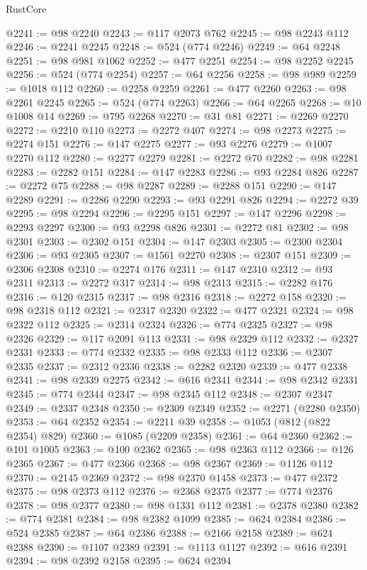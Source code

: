\begin{lexlean}{RustCore}
\begin{coremodule}
@2241 := @98 @2240
@2243 := @117 @2073 @762
@2245 := @98 @2243 @112
@2246 := @2241 @2245
@2248 := @524 (@774 @2246)
@2249 := @64 @2248
@2251 := @98 @981 @1062
@2252 := @477 @2251
@2254 := @98 @2252 @2245
@2256 := @524 (@774 @2254)
@2257 := @64 @2256
@2258 := @98 @989
@2259 := @1018 @112
@2260 := @2258 @2259
@2261 := @477 @2260
@2263 := @98 @2261 @2245
@2265 := @524 (@774 @2263)
@2266 := @64 @2265
@2268 := @10 @1008 @14
@2269 := @795 @2268
@2270 := @31 @81
@2271 := @2269 @2270
@2272 := @2210 @110
@2273 := @2272 @407
@2274 := @98 @2273
@2275 := @2274 @151
@2276 := @147 @2275
@2277 := @93 @2276
@2279 := @1007 @2270 @112
@2280 := @2277 @2279
@2281 := @2272 @70
@2282 := @98 @2281
@2283 := @2282 @151
@2284 := @147 @2283
@2286 := @93 @2284 @826
@2287 := @2272 @75
@2288 := @98 @2287
@2289 := @2288 @151
@2290 := @147 @2289
@2291 := @2286 @2290
@2293 := @93 @2291 @826
@2294 := @2272 @39
@2295 := @98 @2294
@2296 := @2295 @151
@2297 := @147 @2296
@2298 := @2293 @2297
@2300 := @93 @2298 @826
@2301 := @2272 @81
@2302 := @98 @2301
@2303 := @2302 @151
@2304 := @147 @2303
@2305 := @2300 @2304
@2306 := @93 @2305
@2307 := @1561 @2270
@2308 := @2307 @151
@2309 := @2306 @2308
@2310 := @2274 @176
@2311 := @147 @2310
@2312 := @93 @2311
@2313 := @2272 @317
@2314 := @98 @2313
@2315 := @2282 @176
@2316 := @120 @2315
@2317 := @98 @2316
@2318 := @2272 @158
@2320 := @98 @2318 @112
@2321 := @2317 @2320
@2322 := @477 @2321
@2324 := @98 @2322 @112
@2325 := @2314 @2324
@2326 := @774 @2325
@2327 := @98 @2326
@2329 := @117 @2091 @113
@2331 := @98 @2329 @112
@2332 := @2327 @2331
@2333 := @774 @2332
@2335 := @98 @2333 @112
@2336 := @2307 @2335
@2337 := @2312 @2336
@2338 := @2282 @2320
@2339 := @477 @2338
@2341 := @98 @2339 @2275
@2342 := @616 @2341
@2344 := @98 @2342 @2331
@2345 := @774 @2344
@2347 := @98 @2345 @112
@2348 := @2307 @2347
@2349 := @2337 @2348
@2350 := @2309 @2349
@2352 := @2271 (@2280 @2350)
@2353 := @64 @2352
@2354 := @2211 @39
@2358 := @1053 (@812 (@822 @2354) @829)
@2360 := @1085 (@2209 @2358)
@2361 := @64 @2360
@2362 := @101 @1005
@2363 := @100 @2362
@2365 := @98 @2363 @112
@2366 := @126 @2365
@2367 := @477 @2366
@2368 := @98 @2367
@2369 := @1126 @112
@2370 := @2145 @2369
@2372 := @98 @2370 @1458
@2373 := @477 @2372
@2375 := @98 @2373 @112
@2376 := @2368 @2375
@2377 := @774 @2376
@2378 := @98 @2377
@2380 := @98 @1331 @112
@2381 := @2378 @2380
@2382 := @774 @2381
@2384 := @98 @2382 @1099
@2385 := @624 @2384
@2386 := @524 @2385
@2387 := @64 @2386
@2388 := @2166 @2158
@2389 := @624 @2388
@2390 := @1107 @2389
@2391 := @1113 @1127
@2392 := @616 @2391
@2394 := @98 @2392 @2158
@2395 := @624 @2394

\end{coremodule}
\end{lexlean}
